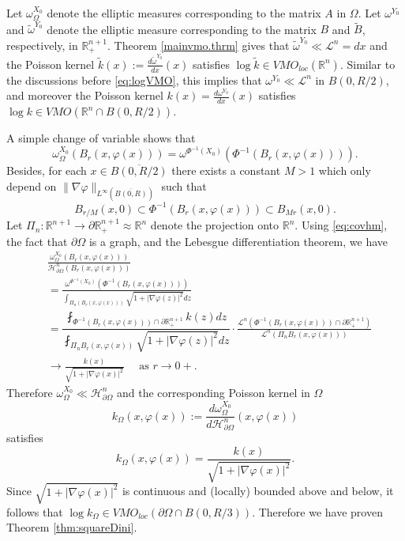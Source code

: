 \documentclass[11pt, a4paper,leqno]{amsart}
\theoremstyle{plain}
\theoremstyle{definition}
\theoremstyle{remark}
\numberwithin{equation}{section}
\newcommand{\RR}{{\mathbb{R}}}
\newcommand{\pO}{\partial\Omega}
\begin{document}
Let $\omega_\Omega^{X_0}$ denote the elliptic measures corresponding to the matrix $A$ in $\Omega$. Let $\omega^{Y_0}$ and $ \widetilde{\omega}^{Y_0}$ denote the elliptic measure corresponding to the matrix $B$ and $ \widetilde{B}$, respectively, in $\RR^{n+1}_+$. Theorem \ref{mainvmo.thrm} gives that $\widetilde{\omega}^{Y_0} \ll \mathcal{L}^n = dx$ and the Poisson kernel $\widetilde{k}(x) := \frac{d\widetilde{\omega}^{Y_0}}{dx}(x)$ satisfies $\log \widetilde{k} \in VMO_{loc}(\RR^n)$. Similar to the discussions before \eqref{eq:logVMO}, this implies that $\omega^{Y_0} \ll \mathcal{L}^n$ in $B(0, R/2)$, and moreover the Poisson kernel $k(x) = \frac{d\omega^{Y_0}}{dx}(x)$ satisfies $\log k \in VMO(\RR^n \cap B(0, R/2))$.


A simple change of variable shows that
\begin{equation}\label{eq:covhm}
	\omega_\Omega^{X_0} (B_r(x,\varphi(x))) = \omega^{\Phi^{-1}(X_0)}(\Phi^{-1}(B_r(x,\varphi(x)))). 
\end{equation} 
Besides, for each $x \in \overline{B(0, R/2)}$ there exists a constant $M>1$ which only depend on $\|\nabla \varphi\|_{L^\infty(\overline{B(0,R)})}$ 
such that
\[ B_{r/M} (x, 0) \subset \Phi^{-1}(B_r(x,\varphi(x))) \subset B_{Mr}(x,0). \]
Let $\Pi_n: \RR^{n+1} \to \partial \RR^{n+1}_+ \approx \RR^n$ denote the projection onto $\RR^n$. Using \eqref{eq:covhm}, the fact that $\partial\Omega$ is a graph, and the Lebesgue differentiation theorem, we have
\begin{align*}
	& \frac{\omega_\Omega^{X_0}(B_r(x,\varphi(x)))}{ \mathcal{H}^n_{\partial\Omega}(B_r(x,\varphi(x)))} \\
	& = \frac{\omega^{\Phi^{-1}(X_0)}(\Phi^{-1}(B_r(x,\varphi(x)))) }{\int_{\Pi_n(B_r(x,\varphi(x))) } \sqrt{1+|\nabla \varphi(z)|^2} dz } \\
	& = \dfrac{ \fint_{\Phi^{-1}(B_r(x,\varphi(x))) \cap \partial \RR^{n+1}_+ } k(z) dz  }{ \fint_{\Pi_n B_r(x,\varphi(x)) } \sqrt{1+|\nabla \varphi(z)|^2} dz} \cdot \frac{\mathcal{L}^n(\Phi^{-1}(B_r(x,\varphi(x))) \cap \partial \RR^{n+1}_+) }{\mathcal{L}^n(\Pi_n B_r(x,\varphi(x))) } \\
	& \to \frac{k(x)}{\sqrt{1+|\nabla \varphi(x)|^2}} \quad \text{ as } r\to 0+.
\end{align*}
Therefore $\omega_\Omega^{X_0} \ll \mathcal{H}^n_{\partial\Omega}$ and the corresponding Poisson kernel in $\Omega$
\[ k_\Omega(x,\varphi(x)) := \frac{ d\omega_\Omega^{X_0}}{ d\mathcal{H}^n_{\pO}}(x,\varphi(x)) \] satisfies
\[ k_\Omega(x,\varphi(x)) = \frac{k(x)}{ \sqrt{1+|\nabla \varphi(x)|^2}}. \]
Since $\sqrt{1+|\nabla \varphi(x)|^2}$ is continuous and (locally) bounded above and below, it follows that $\log k_\Omega \in VMO_{loc}(\partial\Omega \cap B(0, R/3))$. Therefore we have proven Theorem \ref{thm:squareDini}.
\end{document}
